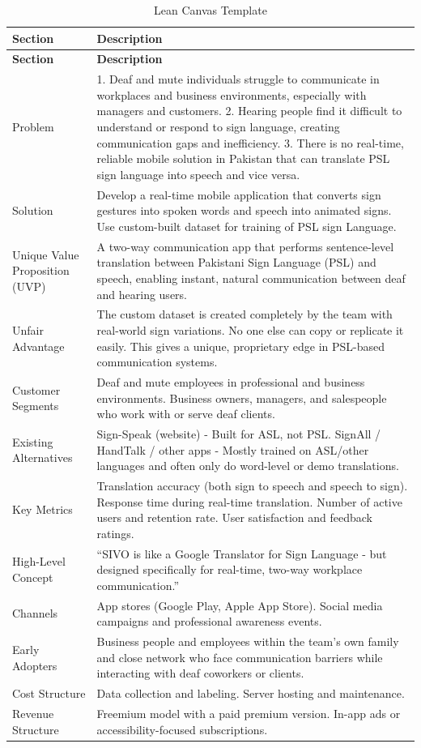 \documentclass[12pt,a4paper,oneside]{report}
\begin{document}
\begin{longtable}{|p{1.6in}|p{4.3in}|}
\caption{Lean Canvas Template}\label{tab:leancanvas}\\
\hline
\textbf{Section} & \textbf{Description} \\
\hline
\endfirsthead
\hline
\textbf{Section} & \textbf{Description} \\
\hline
\endhead
Problem & 1. Deaf and mute individuals struggle to communicate in workplaces and business environments, especially with managers and customers. 2. Hearing people find it difficult to understand or respond to sign language, creating communication gaps and inefficiency. 3. There is no real-time, reliable mobile solution in Pakistan that can translate PSL sign language into speech and vice versa. \\
\hline
Solution & Develop a real-time mobile application that converts sign gestures into spoken words and speech into animated signs. Use custom-built dataset for training of PSL sign Language. \\
\hline
Unique Value Proposition (UVP) & A two-way communication app that performs sentence-level translation between Pakistani Sign Language (PSL) and speech, enabling instant, natural communication between deaf and hearing users. \\
\hline
Unfair Advantage & The custom dataset is created completely by the team with real-world sign variations. No one else can copy or replicate it easily. This gives a unique, proprietary edge in PSL-based communication systems. \\
\hline
Customer Segments & Deaf and mute employees in professional and business environments. Business owners, managers, and salespeople who work with or serve deaf clients. \\
\hline
Existing Alternatives & Sign-Speak (website) - Built for ASL, not PSL. SignAll / HandTalk / other apps - Mostly trained on ASL/other languages and often only do word-level or demo translations. \\
\hline
Key Metrics & Translation accuracy (both sign to speech and speech to sign). Response time during real-time translation. Number of active users and retention rate. User satisfaction and feedback ratings. \\
\hline
High-Level Concept & ``SIVO is like a Google Translator for Sign Language - but designed specifically for real-time, two-way workplace communication.'' \\
\hline
Channels & App stores (Google Play, Apple App Store). Social media campaigns and professional awareness events. \\
\hline
Early Adopters & Business people and employees within the team's own family and close network who face communication barriers while interacting with deaf coworkers or clients. \\
\hline
Cost Structure & Data collection and labeling. Server hosting and maintenance. \\
\hline
Revenue Structure & Freemium model with a paid premium version. In-app ads or accessibility-focused subscriptions. \\
\hline
\end{longtable}
\end{document}
